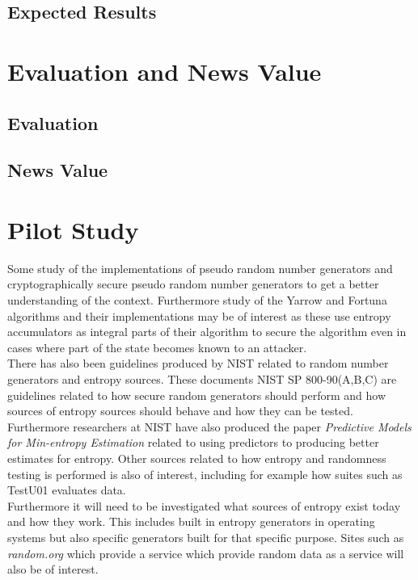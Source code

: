 \documentclass[a4paper,11pt]{report}
\begin{document}
\subsection*{Expected Results}
\section*{Evaluation and News Value}
\subsection*{Evaluation}
\subsection*{News Value}

\section*{Pilot Study}
Some study of the implementations of pseudo random number generators and
cryptographically secure pseudo random number generators to get a better
understanding of the context. Furthermore study of the Yarrow and
Fortuna algorithms and their implementations may be of interest as these 
use entropy accumulators as integral parts of their algorithm to secure the 
algorithm even in cases where part of the state becomes known to an attacker.
\\

\noindent
There has also been guidelines produced by NIST related to random number
generators and entropy sources. These documents NIST SP 800-90(A,B,C) 
\cite{800-90A}\cite{800-90B}\cite{800-90C} are guidelines related to 
how secure random generators should perform and how sources of entropy 
sources should behave and how they can be tested.
Furthermore researchers at NIST have also produced 
the paper \textit{Predictive Models for Min-entropy Estimation}
\cite{eprint-2015-26658}
related to using predictors to producing better estimates for entropy.
Other sources related to how entropy and randomness testing is performed is
also of interest, including for example how suites such as TestU01 evaluates
data.
\\

\noindent
Furthermore it will need to be investigated what sources of entropy exist today
and how they work. This includes built in entropy generators in operating 
systems but also specific generators built for that specific purpose. Sites
such as \textit{random.org} which provide a service which provide random 
data as a service will also be of interest.
\\
\end{document}
